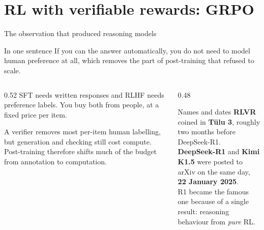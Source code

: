 \documentclass[aspectratio=169,10pt]{beamer}
\begin{document}
\section{RL with verifiable rewards: GRPO}

\begin{frame}{The observation that produced reasoning models}
  \begin{block}{In one sentence}
    If you can  the answer automatically, you do not need to model
    human preference at all, which removes the part of post-training that
    refused to scale.
  \end{block}
  \vspace{0.5em}
  \begin{columns}[T]
    \begin{column}{0.52\textwidth}
      SFT needs written responses and RLHF needs preference labels. You buy
      both from people, at a fixed price per item.
      \vspace{0.4em}

      A verifier removes most per-item human labelling, but generation and
      checking still cost compute. Post-training therefore shifts much of the
      budget from annotation to computation.
    \end{column}
    \begin{column}{0.48\textwidth}
      \begin{block}{Names and dates}
        \small
        \textbf{RLVR} coined in \textbf{Tülu 3}, roughly two months before
        DeepSeek-R1.\\[0.4em]
        \textbf{DeepSeek-R1} and \textbf{Kimi K1.5} were posted to arXiv on
        the same day, \textbf{22 January 2025}.\\[0.4em]
        R1 became the famous one because of a single result: reasoning
        behaviour from \emph{pure} RL.
      \end{block}
    \end{column}
  \end{columns}
\end{frame}
\end{document}
